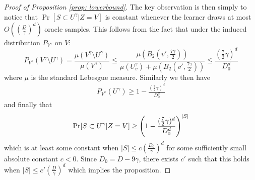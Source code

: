 \begin{proof}[Proof of Proposition \ref{prop: lowerbound}]
The key observation is then simply to notice that $\Pr[S \subset U^\gamma | Z=V]$ is constant whenever the learner draws at most $O((\frac{D}{\gamma})^d)$ oracle samples. This follows from the fact that under the induced distribution $P_{V^\gamma}$ on $V$:
\begin{equation}
 P_{V^\gamma}(V^\gamma\setminus U^\gamma) = \frac{\mu(V^\gamma\setminus U^\gamma)}{\mu(V^{\gamma})} \le \frac{\mu(B_2(v',\frac{7\gamma}{2}))}{\mu(U^\gamma_v) + \mu(B_2(v',\frac{7\gamma}{2}))} \le \frac{(\frac{7}{2}\gamma)^d}{D_0^d}\nonumber
\end{equation}
where $\mu$ is the standard Lebesgue measure. Similarly we then have
\begin{align*}
    P_{V^\gamma}(U^\gamma) \ge 1 - \frac{(\frac{7}{2}\gamma)^d}{D_0^d} \label{eq: U}
\end{align*}
and finally that
\begin{align*}
    \Pr[S \subset U^\gamma | Z=V] \geq  \left( {1 - \frac{(\frac{7}{2}\gamma)^d}{D_0^d}} \right) ^{|S|}
\end{align*}
which is at least some constant when $|S| \leq c(\frac{D_0}{\gamma})^d$ for some sufficiently small absolute constant $c<0$. Since $D_0 = D - 9\gamma$, there exists $c'$ such that this holds when $|S| \leq c'(\frac{D}{\gamma})^d$ which implies the proposition.





\end{proof}
